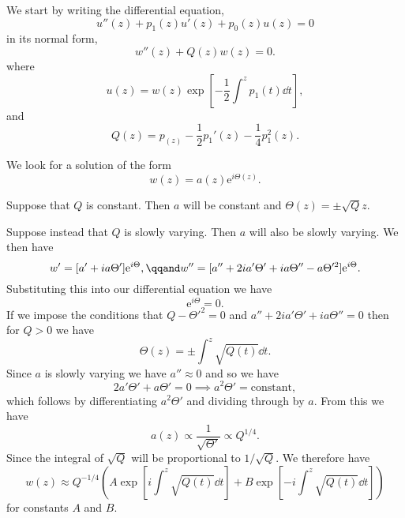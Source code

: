 \documentclass[fleqn]{NotesClass}
\newcommand*{\e}{\mathrm{e}}
\begin{document}
    We start by writing the differential equation,
    \begin{equation}
        u''(z) + p_1(z)u'(z) + p_0(z)u(z) = 0
    \end{equation}
    in its normal form,
    \begin{equation}
        w''(z) + Q(z)w(z) = 0.
    \end{equation}
    where
    \begin{equation}
        u(z) = w(z)\exp\left[ -\frac{1}{2}\int^z p_1(t) \dd{t} \right],
    \end{equation}
    and
    \begin{equation}
        Q(z) = p_(z) - \frac{1}{2}p_1'(z) - \frac{1}{4}p_1^2(z).
    \end{equation}
    
    We look for a solution of the form
    \begin{equation}
        w(z) = a(z) \e^{i\Theta(z)}.
    \end{equation}
    
    Suppose that \(Q\) is constant.
    Then \(a\) will be constant and \(\Theta(z) = \pm \sqrt{Q}z\).
    
    Suppose instead that \(Q\) is slowly varying.
    Then \(a\) will also be slowly varying.
    We then have
    \begin{equation}
        w' = [a' + ia\Theta']\e^{i\Theta}, \qqand w'' = [a'' + 2ia'\Theta' + ia\Theta'' - a\Theta'^2]\e^{i\Theta}.
    \end{equation}
    Substituting this into our differential equation we have
    \begin{equation}
        [a'' + 2ia'\Theta' + ia\Theta'' + (Q - \Theta'^2)a]\e^{i\Theta} = 0.
    \end{equation}
    If we impose the conditions that \(Q - \Theta'^2 = 0\) and \(a'' + 2ia'\Theta' + ia\Theta'' = 0\) then for \(Q > 0\) we have
    \begin{equation}
        \Theta(z) = \pm \int^z \sqrt{Q(t)}\dd{t}.
    \end{equation}
    Since \(a\) is slowly varying we have \(a'' \approx 0\) and so we have
    \begin{equation}
        2a'\Theta' + a\Theta' = 0 \implies a^2\Theta' = \text{constant},
    \end{equation}
    which follows by differentiating \(a^2\Theta'\) and dividing through by \(a\).
    From this we have
    \begin{equation}
        a(z) \propto \frac{1}{\sqrt{\Theta'}} \propto Q^{1/4}.
    \end{equation}
    Since the integral of \(\sqrt{Q}\) will be proportional to \(1/\sqrt{Q}\).
    We therefore have
    \begin{equation}
        w(z) \approx Q^{-1/4} \left( A \exp\left[ i\int^z \sqrt{Q(t)} \dd{t} \right] + B \exp\left[ -i\int^z \sqrt{Q(t)} \dd{t} \right] \right)
    \end{equation}
    for constants \(A\) and \(B\).
    
\end{document}

